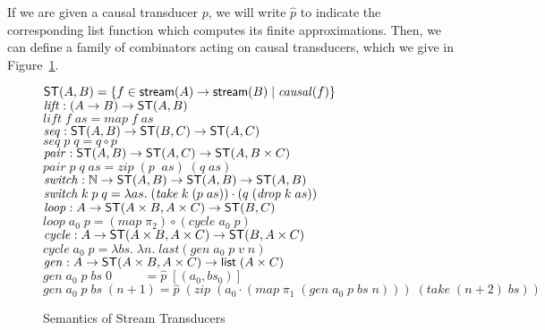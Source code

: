If we are given a causal transducer $p$, we will write $\hat{p}$ to
indicate the corresponding list function which computes its finite
approximations. Then, we can define a family of combinators acting on
causal transducers, which we give in Figure~\ref{transducer-semantics}.

\begin{figure}
\mbox{}
\begin{tabbing}
$\mathsf{ST}({A}, {B}) = \{{{f \in \mathsf{stream}({A}) \to \mathsf{stream}({B})}\;|\;{\mathit{causal}(f)}}\}$\\[1em]

$\mathit{lift} : (A \to B) \to \mathsf{ST}({A}, {B})$ \\
$\mathit{lift}\;f\;as = \mathit{map}\;f\;as$ \\[1em]

$\mathit{seq}  : \mathsf{ST}({A}, {B}) \to \mathsf{ST}({B}, {C}) \to \mathsf{ST}({A}, {C})$ \\
$\mathit{seq}\;p\;q = q \circ p$ \\[1em]

$\mathit{pair}  : \mathsf{ST}({A}, {B}) \to \mathsf{ST}({A}, {C}) \to \mathsf{ST}({A}, {B \times C})$ \\
$\mathit{pair}\; p\;q\;as = \mathit{zip}\; (p\;\;as)\;(q\;as)$\\[1em]

$\mathit{switch} : \mathbb{N} \to \mathsf{ST}({A}, {B}) \to \mathsf{ST}({A}, {B}) \to \mathsf{ST}({A}, {B})$ \\
$\mathit{switch}\;k\;p\;q = \lambda as.\;(\mathit{take}\;k\;(p\;as))\cdot(q\;(\mathit{drop}\;k\;as))$ \\[1em]

$\mathit{loop} : A \to \mathsf{ST}({A\times B}, {A \times C}) \to \mathsf{ST}({B}, {C})$ \\
$\mathit{loop}\;a_0\;p = (\mathit{map}\;\pi_2) \circ (\mathit{cycle}\;a_0\;p)$ \\[1em]

$\mathit{cycle} : A \to \mathsf{ST}({A\times B}, {A \times C}) \to \mathsf{ST}({B}, {A \times C})$ \\
$\mathit{cycle}\;a_0\;p = \lambda bs.\;\lambda n.\;last(gen\;a_0\;p\;v\;n)$ \\[1em]

$\mathit{gen} : A \to \mathsf{ST}({A\times B}, {A \times C}) \to \mathsf{list}\;{(A \times C)}$\\
$\mathit{gen}\;a_0\;p\;bs\;0 \qquad\;\; = \hat{p}\; [(a_0, bs_0)]$ \\
$\mathit{gen}\;a_0\;p\;bs\;(n+1) = \hat{p}\;(\mathit{zip} \;(a_0 \cdot (\mathit{map}\;\pi_1\;(\mathit{gen}\;a_0\;p\;bs\;n)))\;
                                        (\mathit{take}\;(n+2)\;bs))$ 
\end{tabbing}
\caption{Semantics of Stream Transducers}
\label{transducer-semantics}
\end{figure}


